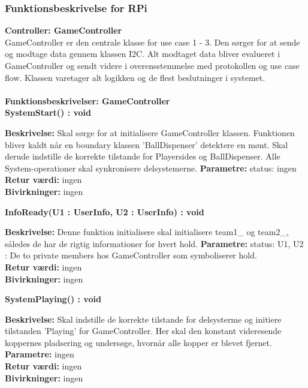 \documentclass[Arkitektur/System_main.tex]{subfiles}
\begin{document}
\subsubsection{Funktionsbeskrivelse for RPi}
\large{\textbf{Controller:  GameController}}\\
GameController er den centrale klasse for use case 1 - 3. Den sørger for at sende og modtage data gennem klassen I2C. Alt modtaget data bliver evalueret i GameController og sendt videre i overensstemmelse med protokollen og use case flow. Klassen varetager alt logikken og de flest beslutninger i systemet.\\\\
{\large\textbf{Funktionsbeskrivelser: GameController}}\\[0.2cm]
\textbf{SystemStart() : void}
\begin{adjustwidth}{1cm}{0pt}
\textbf{Beskrivelse:} Skal sørge for at initialisere GameController klassen. Funktionen bliver kaldt når en boundary klassen 'BallDispenser' detektere en mønt. Skal derude indstille de korrekte tilstande for Playersides og BallDispenser. Alle System-operationer skal synkronisere delsystemerne.   
\textbf{Parametre:} status: ingen \\[0.2cm]
\textbf{Retur værdi:} ingen \\[0.2cm]
\textbf{Bivirkninger:} ingen \\[0.2cm]
\end{adjustwidth}
\textbf{InfoReady(U1 : UserInfo, U2 : UserInfo) : void}
\begin{adjustwidth}{1cm}{0pt}
\textbf{Beskrivelse:} Denne funktion initialisere skal initialisere team1\_ og team2\_, således de har de rigtig informationer for hvert hold. 
\textbf{Parametre:} status: U1, U2 : De to private members hos GameController som symboliserer hold.  \\[0.2cm]
\textbf{Retur værdi:} ingen \\[0.2cm]
\textbf{Bivirkninger:} ingen \\[0.2cm]
\end{adjustwidth}

\textbf{SystemPlaying() : void}
\begin{adjustwidth}{1cm}{0pt}
\textbf{Beskrivelse:} Skal indstille de korrekte tilstande for delsysterme og initiere tilstanden 'Playing' for GameController. Her skal den konstant videresende koppernes pladsering og undersøge, hvornår alle kopper er blevet fjernet. 
\textbf{Parametre:} ingen \\[0.2cm]
\textbf{Retur værdi:} ingen \\[0.2cm]
\textbf{Bivirkninger:} ingen \\[0.2cm]
\end{adjustwidth}
\end{document}

